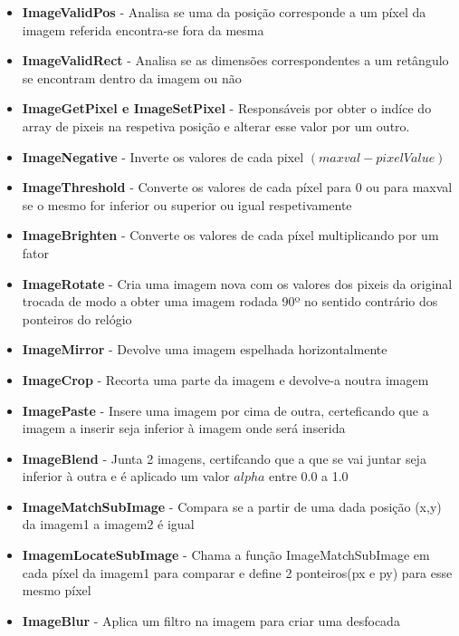     \begin{itemize}
        \item \textbf{ImageValidPos} - Analisa se uma da posição corresponde a um píxel da imagem referida
            encontra-se fora da mesma
        \item \textbf{ImageValidRect} - Analisa se as dimensões correspondentes a um retângulo se encontram
            dentro da imagem ou não
        \item \textbf{ImageGetPixel e ImageSetPixel} - Responsáveis por obter o indíce do array de pixeis
            na respetiva posição e alterar esse valor por um outro.
        \item \textbf{ImageNegative} - Inverte os valores de cada pixel $(maxval - pixelValue)$
        \item \textbf{ImageThreshold} - Converte os valores de cada píxel para 0 ou para maxval
            se o mesmo for inferior ou superior ou igual respetivamente
        \item \textbf{ImageBrighten} - Converte os valores de cada píxel multiplicando por um fator
        \item \textbf{ImageRotate} - Cria uma imagem nova com os valores dos pixeis da original
            trocada de modo a obter uma imagem rodada 90º no sentido contrário dos ponteiros do relógio
        \item \textbf{ImageMirror} - Devolve uma imagem espelhada horizontalmente
        \item \textbf{ImageCrop} - Recorta uma parte da imagem e devolve-a noutra imagem
        \item \textbf{ImagePaste} - Insere uma imagem por cima de outra, certeficando que
            a imagem a inserir seja inferior à imagem onde será inserida
        \item \textbf{ImageBlend} - Junta 2 imagens, certifcando que a que se vai juntar seja 
         inferior à outra e é aplicado um valor $alpha$ entre 0.0 a 1.0
        \item \textbf{ImageMatchSubImage} - Compara se a partir de uma dada posição (x,y) 
            da imagem1 a imagem2 é igual
        \item \textbf{ImagemLocateSubImage} - Chama a função ImageMatchSubImage em cada píxel da
            imagem1 para comparar e define 2 ponteiros(px e py) para esse mesmo píxel
        \item \textbf{ImageBlur} - Aplica um filtro na imagem para criar uma desfocada
    \end{itemize}

    